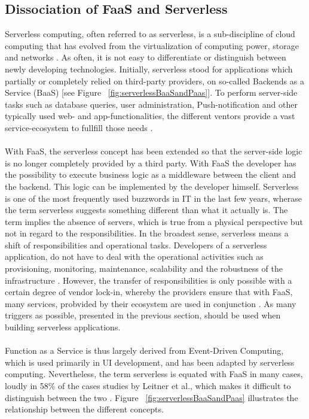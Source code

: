 \documentclass[11pt]{article}
\begin{document}
\subsection{Dissociation of FaaS and Serverless}
Serverless computing, often referred to as serverless, is a sub-discipline of cloud computing that has evolved from the virtualization of computing power, storage and networks \cite{jackson2018investigation}. As often, it is not easy to differentiate or distinguish between newly developing technologies. Initially, serverless stood for applications which partially or completely relied on third-party providers, on so-called Backends as a Service (BaaS) [see Figure ~\ref{fig:serverlessBaaSandPaas}]. To perform server-side tasks such as database queries, user administration, Push-notification and other typically used web- and app-functionalities, the different ventors provide a vast service-ecosystem to fullfill those needs \cite{fowler2018serverless}.\\\\
With FaaS, the serverless concept has been extended so that the server-side logic is no longer completely provided by a third party. With FaaS the developer has the possibility to execute business logic as a middleware between the client and the backend. This logic  can be implemented by the developer himself. Serverless is one of the most frequently used buzzwords in IT in the last few years, wherase the term \glqq serverless\grqq{} suggests something different than what it actually is. The term implies the absence of servers, which is true from a physical perspective but not in regard to the responsibilities. In the broadest sense, serverless means a shift of responsibilities and operational tasks. Developers of a serverless application, do not have to deal with the operational activities such as provisioning, monitoring, maintenance, scalability and the robustness of the infrastructure \cite{baldini2017serverless}. However, the transfer of responsibilities is only possible with a certain degree of vendor lock-in, whereby the providers ensure that with FaaS, many services, probvided by their ecosystem are used in conjunction \cite{kritikos2018review}. As many triggers as possible, presented in the previous section, should be used when building serverless applications.\\\\
Function as a Service is thus largely derived from Event-Driven Computing, which is used primarily in UI development, and has been adapted by serverless computing. Nevertheless, the term serverless is equated with FaaS in many cases, loudly in 58\% of the cases studies by Leitner et al., which makes it difficult to distinguish between the two \cite{leitner2019mixed}. Figure ~\ref{fig:serverlessBaaSandPaas} illustrates the relationship between the different concepts.
\end{document}
